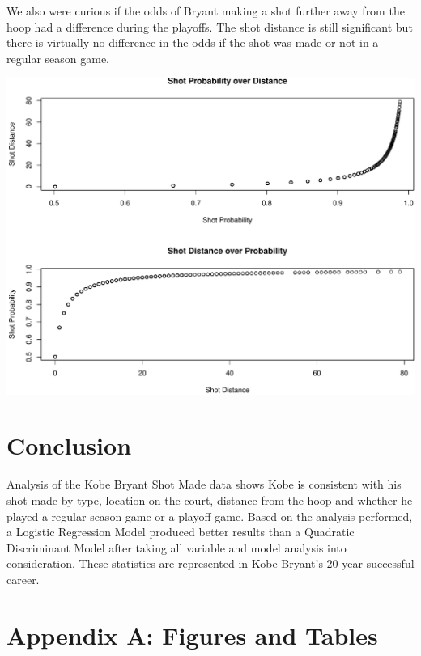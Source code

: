 \documentclass[american,]{article}
\begin{document}
We also were curious if the odds of Bryant making a shot further away from the hoop had a difference during the playoffs. The shot distance is still significant but there is virtually no difference in the odds if the shot was made or not in a regular season game.

\begin{center}\includegraphics{Final_Project_Applied_files/figure-latex/Probabilities-1} \end{center}

\hypertarget{conclusion}{%
\section{\texorpdfstring{\textbf{Conclusion}}{Conclusion}}\label{conclusion}}

Analysis of the Kobe Bryant Shot Made data shows Kobe is consistent with his shot made by type, location on the court, distance from the hoop and whether he played a regular season game or a playoff game. Based on the analysis performed, a Logistic Regression Model produced better results than a Quadratic Discriminant Model after taking all variable and model analysis into consideration. These statistics are represented in Kobe Bryant's 20-year successful career.

\newpage

\hypertarget{appendix-a-figures-and-tables}{%
\section{Appendix A: Figures and Tables}\label{appendix-a-figures-and-tables}}
\end{document}
